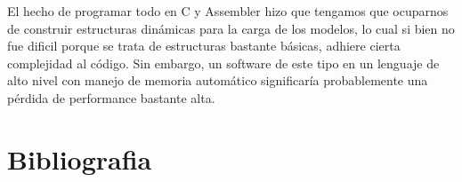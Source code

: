 \documentclass[a4paper]{article}
\begin{document}
El hecho de programar todo en C y Assembler hizo que tengamos que ocuparnos de construir estructuras dinámicas para la carga de los modelos, lo cual si bien no fue dificil porque se trata de estructuras bastante básicas, adhiere cierta complejidad al código. Sin embargo, un software de este tipo en un lenguaje de alto nivel con manejo de memoria automático significaría probablemente una pérdida de performance bastante alta.

\section{Bibliografia}
\end{document}
